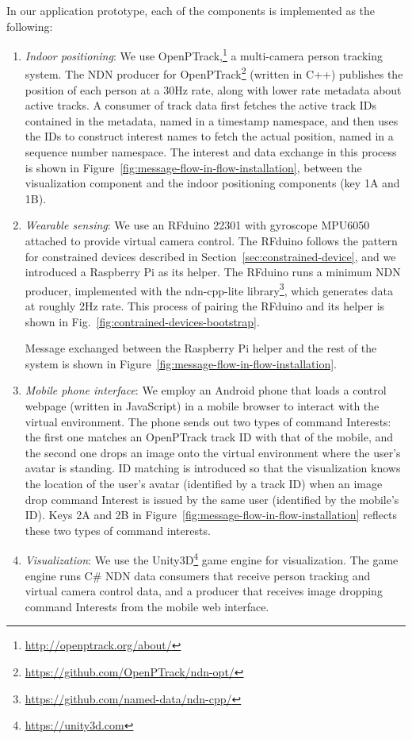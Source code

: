 In our application prototype, each of the components is implemented as the following:
\begin{enumerate}
\item \emph{Indoor positioning}: We use OpenPTrack,\footnote{\url{http://openptrack.org/about/}} a multi-camera person tracking system.
The NDN producer for OpenPTrack\footnote{\url{https://github.com/OpenPTrack/ndn-opt/}} (written in C++) publishes the position of each person at a 30Hz rate, along with lower rate metadata about active tracks. 
A consumer of track data first fetches the active track IDs contained in the metadata, named in a timestamp namespace, and then uses the IDs to construct interest names to fetch the actual position, named in a sequence number namespace.
The interest and data exchange in this process is shown in Figure~\ref{fig:message-flow-in-flow-installation}, between the visualization component and the indoor positioning components (key 1A and 1B).
\item \emph{Wearable sensing}: We use an RFduino 22301 with gyroscope MPU6050 attached to provide virtual camera control. 
The RFduino follows the pattern for constrained devices described in Section~\ref{sec:constrained-device}, and we introduced a Raspberry Pi as its helper.
The RFduino runs a minimum NDN producer, implemented with the ndn-cpp-lite library\footnote{\url{https://github.com/named-data/ndn-cpp/}}, which generates data at roughly 2Hz rate.
This process of pairing the RFduino and its helper is shown in Fig.~\ref{fig:contrained-devices-bootstrap}.

Message exchanged between the Raspberry Pi helper and the rest of the system is shown in Figure~\ref{fig:message-flow-in-flow-installation}.
\item \emph{Mobile phone interface}: We employ an Android phone that loads a control webpage (written in JavaScript) in a mobile browser to interact with the virtual environment. 
The phone sends out two types of command Interests: the first one matches an OpenPTrack track ID with that of the mobile, and the second one drops an image onto the virtual environment where the user's avatar is standing. 
ID matching is introduced so that the visualization knows the location of the user's avatar (identified by a track ID) when an image drop command Interest is issued by the same user (identified by the mobile's ID).
Keys 2A and 2B in Figure~\ref{fig:message-flow-in-flow-installation} reflects these two types of command interests.
\item \emph{Visualization}: We use the Unity3D\footnote{\url{https://unity3d.com}} game engine for visualization.
The game engine runs C\# NDN data consumers that receive person tracking and virtual camera control data, and a producer that receives image dropping command Interests from the mobile web interface.


\end{enumerate}
